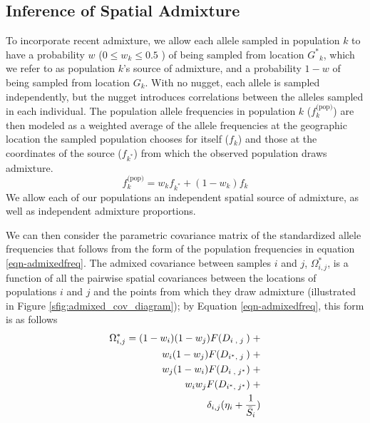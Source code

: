 \documentclass[12pt]{article}
\newcommand{\identifyadmixsource}[1]{{#1^{*}}}
\begin{document}
\subsection*{Inference of Spatial Admixture}

To incorporate recent admixture, we allow
each allele sampled in population $k$ to have a probability $w$ ($0 \leq w_k \leq 0.5$ ) of being sampled from location $\identifyadmixsource{G}_k$,
which we refer to as population $k$'s source of admixture,
and a probability $1-w$ of being sampled from location $G_k$.
With no nugget, each allele is sampled independently, but the nugget introduces correlations between the alleles sampled in each individual.
The population allele frequencies in population $k$ ($f^{\text{(pop)}}_k$) 
are then modeled as a weighted average of the allele frequencies at the geographic location the sampled population chooses for itself ($f_{k}$) 
and those at the coordinates of the source ($f_{\identifyadmixsource{k}}$) from which the observed population draws admixture.
\begin{equation}
f^{\text{(pop)}}_k = w_k f_{\identifyadmixsource{k}} + (1-w_k)f_{k}   \label{eqn-admixedfreq}
\end{equation}
We allow each of our populations an independent spatial source of admixture, as well as independent admixture proportions.

We can then consider the parametric covariance matrix of the standardized allele frequencies that follows from the form of the population frequencies in equation \eqref{eqn-admixedfreq}.  The admixed covariance between samples $i$ and $j$, $\identifyadmixsource{\Omega_{i,j}}$, is a function of all the pairwise spatial covariances between the locations of populations $i$ and $j$ and the points from which they draw admixture (illustrated in Figure \ref{sfig:admixed_cov_diagram}); by Equation \eqref{eqn-admixedfreq}, this form is as follows
\begin{alignat}{3}
\label{eq:admixed_covariance_1}
\identifyadmixsource{\Omega_{i,j}} = (1-w_i)(1-w_j) F(D_{i\;,\;j\;}) \; +&\\
w_i(1-w_j) F(D_{\identifyadmixsource{i},\;j\;}) \; +   \notag&\\
w_j(1-w_i) F(D_{i\;,\;\identifyadmixsource{j}}) \; +   \notag&\\
w_i w_j F(D_{\identifyadmixsource{i},\;\identifyadmixsource{j}}) \; +   \notag&\\
\delta_{i,j} (\eta_i + \frac{1}{\bar{S}_i}) \notag&
\end{alignat}
\end{document}
